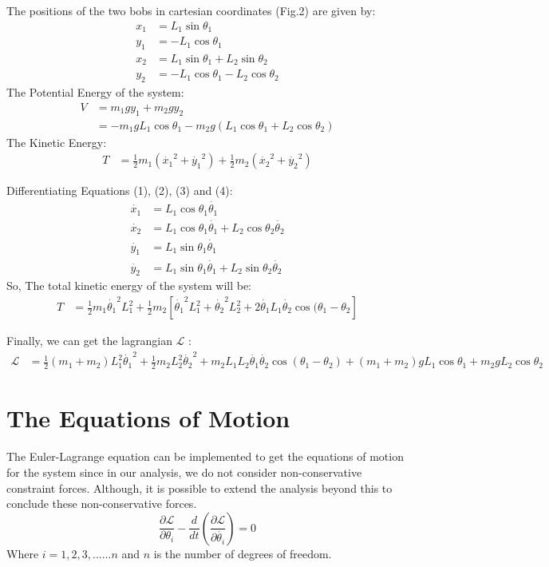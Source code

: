 \documentclass[11]{article}
\begin{document}
\noindent The positions of the two bobs in cartesian coordinates (Fig.2) are given by:
\begin{align}
x_{1}&=L_{1}\sin\theta_{1}\\
y_{1}&=-L_{1}\cos\theta_{1}\\
x_{2}&=L_{1}\sin\theta_{1}+L_{2}\sin\theta_{2}\\
y_{2}&=-L_{1}\cos \theta_{1}-L_{2}\cos\theta_{2}
\end{align}
The Potential Energy of the system:
\begin{align}
V&=m_{1}gy_{1} + m_{2}gy_{2}\\
&=-m_{1}gL_{1}\cos\theta_{1}-m_{2}g\left(L_{1}\cos\theta_{1}+L_{2}\cos\theta_{2}\right)
\end{align}
The Kinetic Energy:
\begin{align}
T&=\frac{1}{2}m_{1}\left(\dot{x_{1}}^{2}+\dot{y_{1}}^{2}\right)+\frac{1}{2}m_{2}\left(\dot{x_{2}}^{2}+\dot{y_{2}}^{2}\right)
\end{align}

Differentiating Equations (1), (2), (3) and (4):
\begin{align}
\dot{x_{1}}&=L_{1}\cos\theta_{1}\dot{\theta_{1}}\\
\dot{x_{2}}&=L_{1}\cos\theta_{1}\dot{\theta_{1}}+L_{2}\cos\theta_{2}\dot{\theta_{2}}\\
\dot{y_{1}}&=L_{1}\sin\theta_{1}\dot{\theta_{1}}\\
\dot{y_{2}}&=L_{1}\sin\theta_{1}\dot{\theta_{1}}+L_{2}\sin\theta_{2}\dot{\theta_{2}}
\end{align}
So, The total kinetic energy of the system will be:
\begin{align}
T&=\frac{1}{2}m_{1}\dot{\theta_{1}}^{2}L_{1}^{2}+\frac{1}{2}m_{2}\left[\dot{\theta_{1}}^{2}L_{1}^{2}+\dot{\theta
_{2}}^{2}L_{2}^{2}+2\dot{\theta_{1}}L_{1}\dot{\theta_{2}}\cos(\theta_{1}-\theta_{2}\right]
\end{align}

\noindent Finally, we can get the lagrangian $\mathcal{L}$ :
\begin{align}
\mathcal{L}&=\frac{1}{2}(m_{1}+m_{2})L_{1}^{2}\dot{\theta_{1}}^{2}+\frac{1}{2}m_{2}L_{2}^{2}\dot{\theta_{2}}^{2}+m_{2}L_{1}L_{2}\dot{\theta_{1}}\dot{\theta_{2}}\cos(\theta_{1}-\theta_{2})+(m_{1}+m_{2})gL_{1}\cos\theta_{1}+m_{2}gL_{2}\cos\theta_{2}
\end{align}

\section{The Equations of Motion}
The Euler-Lagrange equation can be implemented to get the equations of motion for the system since in our analysis, we do not consider non-conservative constraint forces. Although, it is possible to extend the analysis beyond this to conclude these non-conservative forces.
$$\frac{\partial \mathcal{L}}{\partial \theta_{i}}-\frac{d}{dt}\left(\frac{\partial \mathcal{L}}{\partial \dot{\theta_{i}}}\right)=0$$ Where $i=1,2,3,......n$ and $n$ is the number of degrees of freedom.
\end{document}
